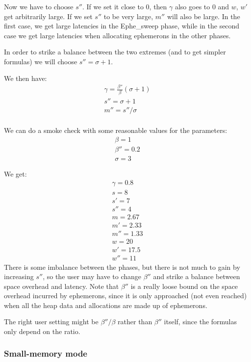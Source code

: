 \documentclass{article}
\begin{document}
Now we have to choose $s''$. If we set it close to 0, then $\gamma$
also goes to 0 and $w$, $w'$ get arbitrarily large. If we set
$s''$ to be very large, $m''$ will also be large. In the first
case, we get large latencies in the Ephe\_sweep phase, while in the
second case we get large latencies when allocating ephemerons in the
other phases.

In order to strike a balance between the two extremes (and to get
simpler formulas) we will choose $s'' = \sigma + 1$.

We then have:
\begin{gather}
\gamma = \frac{\beta''}{\beta}(\sigma + 1) \\
s'' = \sigma + 1 \\
m'' = s''/\sigma \\
\end{gather}

We can do a smoke check with some reasonable values for the
parameters:
\begin{gather}
\beta = 1 \\
\beta'' = 0.2 \\
\sigma = 3
\end{gather}

We get:
\begin{gather}
\gamma = 0.8 \\
s = 8 \\
s' = 7 \\
s'' = 4 \\
m = 2.67 \\
m' = 2.33 \\
m'' = 1.33 \\
w = 20 \\
w' = 17.5 \\
w'' = 11
\end{gather}
There is some imbalance between the phases, but there is not much to
gain by increasing $s''$, so the user may have to change $\beta''$ and
strike a balance between space overhead and latency. Note that
$\beta''$ is a really loose bound on the space overhead incurred by
ephemerons, since it is only approached (not even reached) when all
the heap data and allocations are made up of ephemerons.

The right user setting might be $\beta''/\beta$ rather than $\beta''$
itself, since the formulas only depend on the ratio.


\subsubsection{Small-memory mode}
\end{document}
